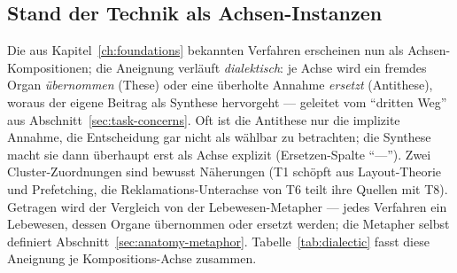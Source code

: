 \begin{nurkurz}
\section{Stand der Technik als Achsen-Instanzen}\label{sec:sota-instances}
Die aus Kapitel~\ref{ch:foundations} bekannten Verfahren erscheinen nun als Achsen-Kompositionen; die Aneignung
verläuft \emph{dialektisch}: je Achse wird ein fremdes Organ \emph{übernommen} (These) oder eine überholte
Annahme \emph{ersetzt} (Antithese), woraus der eigene Beitrag als Synthese hervorgeht --- geleitet vom
\enquote{dritten Weg} aus Abschnitt~\ref{sec:task-concerns}. Oft ist die Antithese nur die implizite Annahme, die
Entscheidung gar nicht als wählbar zu betrachten; die Synthese macht sie dann überhaupt erst als Achse explizit
(Ersetzen-Spalte \enquote{---}). Zwei Cluster-Zuordnungen sind bewusst Näherungen (T1 schöpft aus Layout-Theorie
und Prefetching, die Reklamations-Unterachse von T6 teilt ihre Quellen mit T8). Getragen wird der Vergleich von
der Lebewesen-Metapher --- jedes Verfahren ein Lebewesen, dessen Organe übernommen oder ersetzt werden; die
Metapher selbst definiert Abschnitt~\ref{sec:anatomy-metaphor}. Tabelle~\ref{tab:dialectic} fasst diese
Aneignung je Kompositions-Achse zusammen.
\end{nurkurz}

